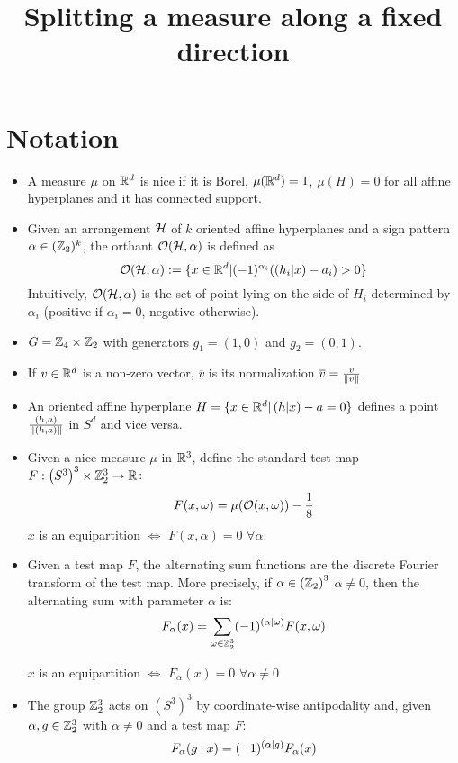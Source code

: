 \documentclass[10pt]{article}
\title{Splitting a measure along a fixed direction}
\author{}
\begin{document}
\maketitle
\section*{Notation}
\begin{itemize}
	\item A measure $\mu$ on $\mathbb{R}^d$ is nice if it is Borel, $\mu(\mathbb{R}^d)=1$, $\mu(H) = 0$ for all affine hyperplanes and it has connected support.
	\item Given an arrangement $\mathcal{H}$ of $k$ oriented affine hyperplanes and a sign pattern $\alpha\in (\mathbb{Z}_2)^k$, the orthant $\mathcal{O}(\mathcal{H}, \alpha)$ is defined as
	\[
		\mathcal{O}(\mathcal{H}, \alpha) := \{x\in \mathbb{R}^d \vert (-1)^{\alpha_i}(\left( h_i \vert x\right) - a_i) > 0 \}
	\]
	Intuitively, $\mathcal{O}(\mathcal{H}, \alpha)$ is the set of point lying on the side of $H_i$ determined by $\alpha_i$ (positive if $\alpha_i=0$, negative otherwise).
	\item $G= \mathbb{Z}_4\times \mathbb{Z}_2$ with generators $g_1 = (1,0)$ and $g_2=(0, 1)$.
	\item If $v\in \mathbb{R}^d$ is a non-zero vector, $\overline{v}$ is its normalization $\overline{v}=\frac{v}{\lVert v \rVert}$.
	\item An oriented affine hyperplane $H = \{x\in \mathbb{R}^d \vert \left( h \vert x\right) - a =0 \}$ defines a point $\frac{(h, a)}{\lVert (h,a) \rVert}$ in $S^d$ and vice versa.
	\item Given a nice measure $\mu$ in $\mathbb{R}^3$, define the standard test map $F:\left(S^3 \right)^3 \times \mathbb{Z}_2^3  \rightarrow \mathbb{R}$:
	\[
		F(x, \omega) = \mu(\mathcal{O}(x, \omega))  - \frac{1}{8}
	\]
	$x$ is an equipartition $\iff$ $F(x, \alpha) = 0$ $\forall \alpha$.
	\item Given a test map $F$, the alternating sum functions are the discrete Fourier transform of the test map. More precisely, if $\alpha \in \left( \mathbb{Z}_2\right)^3$
	$\alpha \neq 0$, then the alternating sum with parameter $\alpha$ is:
	\[
		F_\alpha(x) = \sum_{\omega\in \mathbb{Z}_2^3} (-1)^{\left( \alpha \vert \omega\right)} F(x, \omega)
	\]

	$x$ is an equipartition $\iff$ $F_\alpha(x) = 0$ $\forall \alpha \neq 0$
	\item The group $\mathbb{Z}_2^3$ acts on $\left(S^3 \right)^3$ by coordinate-wise antipodality and, given $\alpha, g \in \mathbb{Z}_2^3$ with $\alpha\neq 0$ and a test map $F$:
	\[
		F_\alpha(g\cdot x) = (-1)^{\left( \alpha \vert g\right)}F_\alpha(x)
	\]
\end{itemize}
\end{document}
